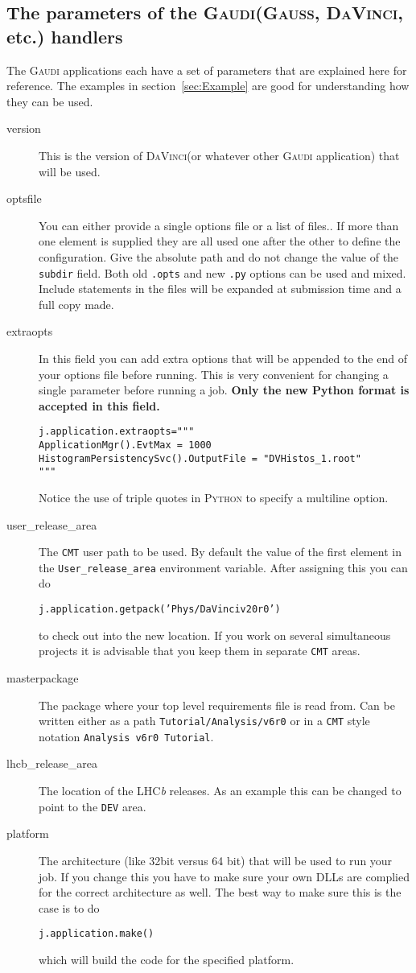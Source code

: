 \documentclass{howto}
\def\python {\textsc{Python}\xspace}
\def\lhcb {LHC{\em b\/}\xspace}
\def\gaudi {\textsc{Gaudi}\xspace}
\def\davinci {\textsc{DaVinci}\xspace}
\def\gauss {\textsc{Gauss}\xspace}
\def\davinciv {v20r0\xspace}
\begin{document}
\subsection{The parameters of the \gaudi (\gauss, \davinci, etc.) handlers}
\label{sec:GaudiParameters}
The \gaudi applications each have a set of parameters that are explained here
for reference. The examples in section~\ref{sec:Example} are good for
understanding how they can be used.
\begin{description}
\item[version] This is the version of \davinci (or whatever other \gaudi
  application) that will be used.
\item[optsfile] You can either provide a single options file or a list of
  files.. If more than one element is supplied they are all used one after the
  other to define the configuration. Give the absolute path and do not change
  the value of the \texttt{subdir} field. Both old \texttt{.opts} and new
  \texttt{.py} options can be used and mixed. Include statements in the files
  will be expanded at submission time and a full copy made.
\item[extraopts] In this field you can add extra options that will be appended
  to the end of your options file before running. This is very convenient for
  changing a single parameter before running a job. \textbf{Only the new
    Python format is accepted in this field.}
\begin{verbatim}
j.application.extraopts="""
ApplicationMgr().EvtMax = 1000
HistogramPersistencySvc().OutputFile = "DVHistos_1.root"
"""
\end{verbatim}
  Notice the use of triple quotes in \python to specify a multiline option.
\item[user_release_area] The \texttt{CMT} user path to be used. By default the
  value of the first element in the \texttt{User_release_area} environment
  variable. After assigning this you can do
\begin{alltt}
j.application.getpack('Phys/DaVinci \davinciv') 
\end{alltt}
  to check out into the new location. If you work on several simultaneous
  projects it is advisable that you keep them in separate \texttt{CMT} areas.
\item[masterpackage] The package where your top level requirements file is
  read from. Can be written either as a path \texttt{Tutorial/Analysis/v6r0}
  or in a \texttt{CMT} style notation \texttt{Analysis v6r0 Tutorial}.
\item[lhcb_release_area] The location of the \lhcb releases. As an example
  this can be changed to point to the \texttt{DEV} area.
\item[platform] The architecture (like 32bit versus 64 bit) that will be used
  to run your job. If you change this you have to make sure your own DLLs are
  complied for the correct architecture as well. The best way to make sure
  this is the case is to do
\begin{verbatim}
j.application.make()
\end{verbatim}
  which will build the code for the specified platform.
\end{description}
\end{document}
